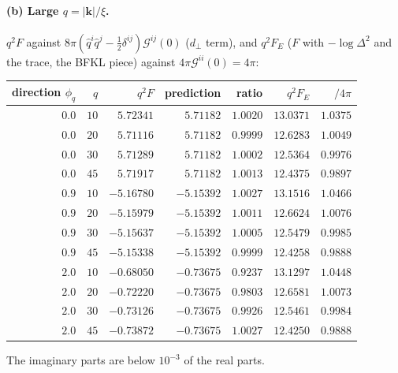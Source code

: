 \documentclass[10pt]{article}
\numberwithin{equation}{section}
\newcommand{\GG}{\mathcal G}
\begin{document}
\paragraph{(b) Large $q=|\mathbf k|/\xi$.} $q^2F$ against $8\pi(\hat q^i\hat q^j-\frac12\delta^{ij})\GG^{ij}(0)$ ($d_\perp$ term), and $q^2F_E$ ($F$ with $-\log\Delta^2$ and the trace, the BFKL piece) against $4\pi\GG^{ii}(0)=4\pi$:
\begin{center}\small
\begin{tabular}{@{}rrrrr|rr@{}}\toprule
direction $\phi_q$ & $q$ & $q^2F$ & prediction & ratio & $q^2F_E$ & $/4\pi$\\\midrule
$0.0$ & $10$ & $5.72341$ & $5.71182$ & $1.0020$ & $13.0371$ & $1.0375$\\
$0.0$ & $20$ & $5.71116$ & $5.71182$ & $0.9999$ & $12.6283$ & $1.0049$\\
$0.0$ & $30$ & $5.71289$ & $5.71182$ & $1.0002$ & $12.5364$ & $0.9976$\\
$0.0$ & $45$ & $5.71917$ & $5.71182$ & $1.0013$ & $12.4375$ & $0.9897$\\
$0.9$ & $10$ & $-5.16780$ & $-5.15392$ & $1.0027$ & $13.1516$ & $1.0466$\\
$0.9$ & $20$ & $-5.15979$ & $-5.15392$ & $1.0011$ & $12.6624$ & $1.0076$\\
$0.9$ & $30$ & $-5.15637$ & $-5.15392$ & $1.0005$ & $12.5479$ & $0.9985$\\
$0.9$ & $45$ & $-5.15338$ & $-5.15392$ & $0.9999$ & $12.4258$ & $0.9888$\\
$2.0$ & $10$ & $-0.68050$ & $-0.73675$ & $0.9237$ & $13.1297$ & $1.0448$\\
$2.0$ & $20$ & $-0.72220$ & $-0.73675$ & $0.9803$ & $12.6581$ & $1.0073$\\
$2.0$ & $30$ & $-0.73126$ & $-0.73675$ & $0.9926$ & $12.5461$ & $0.9984$\\
$2.0$ & $45$ & $-0.73872$ & $-0.73675$ & $1.0027$ & $12.4250$ & $0.9888$\\
\bottomrule
\end{tabular}
\end{center}
The imaginary parts are below $10^{-3}$ of the real parts.
\end{document}
